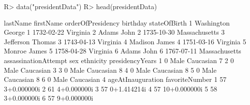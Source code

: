 \documentclass[article,shortnames]{jss}
\begin{document}
\begin{Schunk}
\begin{Sinput}
R> data("presidentData")
R> head(presidentData)
\end{Sinput}
\begin{Soutput}
    lastName firstName orderOfPresidency   birthday  stateOfBirth
1 Washington    George                 1 1732-02-22      Virginia
2      Adams      John                 2 1735-10-30 Massachusetts
3  Jefferson    Thomas                 3 1743-04-13      Virginia
4    Madison     James                 4 1751-03-16      Virginia
5     Monroe     James                 5 1758-04-28      Virginia
6      Adams      John                 6 1767-07-11 Massachusetts
  assassinationAttempt  sex ethnicity presidencyYears
1                    0 Male Caucasian               7
2                    0 Male Caucasian               3
3                    0 Male Caucasian               8
4                    0 Male Caucasian               8
5                    0 Male Caucasian               8
6                    0 Male Caucasian               4
  ageAtInauguration favoriteNumber
1                57    3+0.000000i
2                61    4+0.000000i
3                57    0+1.414214i
4                57   10+0.000000i
5                58    3+0.000000i
6                57    9+0.000000i
\end{Soutput}
\end{Schunk}
\end{document}
